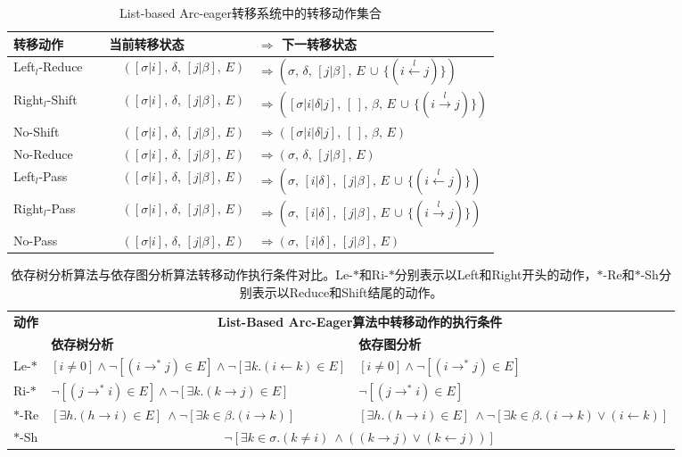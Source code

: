 \begin{table}[htbp]
	\centering
	\begin{tabular}{l|ll}
		\hline
		\bf 转移动作 \ \ \ \ & \bf 当前转移状态 & $\Rightarrow$ \bf 下一转移状态 \\
		\hline\hline
		Left$_l$-Reduce &\ \ $([\sigma|i],\,\delta,\,[j|\beta],\,E)$ & $\Rightarrow (\sigma,\,\delta,\,[j|\beta],\,E\,\cup\,\{(i\xleftarrow{l}j)\})$ \\
		Right$_l$-Shift &\ \ $([\sigma|i],\,\delta,\,[j|\beta],\,E)$ & $\Rightarrow ([\sigma|i|\delta|j],\,[\ ],\,\beta,\,E\,\cup\,\{(i\xrightarrow{l}j)\})$ \\
		No-Shift &\ \ $([\sigma|i],\,\delta,\,[j|\beta],\,E)$ & $\Rightarrow 
		([\sigma|i|\delta|j],\,[\ ],\,\beta,\,E)$ \\
		No-Reduce &\ \ $([\sigma|i],\,\delta,\,[j|\beta],\,E)$ & $\Rightarrow (\sigma,\,\delta,\,[j|\beta],\,E)$\\
		\hline
		Left$_l$-Pass &\ \ $([\sigma|i],\,\delta,\,[j|\beta],\,E)$ & $\Rightarrow (\sigma,\,[i|\delta],\,[j|\beta],\,E\,\cup\,\{(i\xleftarrow{l}j)\})$\\
		Right$_l$-Pass &\ \ $([\sigma|i],\,\delta,\,[j|\beta],\,E)$ & $\Rightarrow (\sigma,\,[i|\delta],\,[j|\beta],\,E\,\cup\,\{(i\xrightarrow{l}j)\})$\\
		No-Pass &\ \ $([\sigma|i],\,\delta,\,[j|\beta],\,E)$ & $\Rightarrow (\sigma,\,[i|\delta]	,\,[j|\beta],\,E)$\\
		\hline
	\end{tabular}
	\caption{List-based Arc-eager转移系统中的转移动作集合}
	\label{tbl:actions}
\end{table}

\begin{table}[t]
	\small
	\centering
	\begin{tabular}{l|l|l}
		\hline
		\multirow{2}{*}{\bf 动作} & \multicolumn{2}{c}{\bf List-Based Arc-Eager算法中转移动作的执行条件} \\
		\cline{2-3}
		& \bf 依存树分析 & \bf 依存图分析 \\
		\hline
		Le-$*$ & $[i\neq0] \wedge \neg[(i\rightarrow ^*j)\in E] \wedge \neg[\exists k.(i\leftarrow k)\in E] $ & $[i\neq0] \wedge \neg[(i\rightarrow ^*j)\in E] $ \\
		Ri-$*$ & $\neg[(j\rightarrow ^*i)\in E] \wedge \neg[\exists k.(k\rightarrow j)\in E] $ & $\neg[(j\rightarrow ^*i)\in E]$ \\
		$*$-Re & $[\exists h.(h\rightarrow i)\in E] \ \wedge \neg[\exists k\in\beta.(i\rightarrow k)]$ & $[\exists h.(h\rightarrow i)\in E] \ \wedge \neg[\exists k\in\beta.(i\rightarrow k)\vee(i\leftarrow k)]$ \\
		$*$-Sh & \multicolumn{2}{c}{ $\neg[\exists k\in \sigma.(k\neq i) \ \wedge ((k\rightarrow j)\vee(k\leftarrow j))]$ } \\
		\hline
	\end{tabular}
	\caption{依存树分析算法与依存图分析算法转移动作执行条件对比。Le-$*$和Ri-$*$分别表示以Left和Right开头的动作，$*$-Re和$*$-Sh分别表示以Reduce和Shift结尾的动作。}
	\label{tbl:preconditions}
\end{table}

